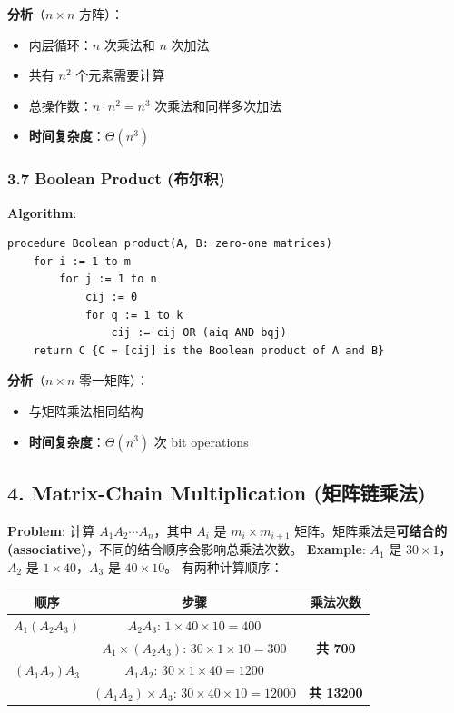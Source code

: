 \documentclass[10pt,a4paper,openany]{ctexbook}
\theoremstyle{definition}
\theoremstyle{remark}
\begin{document}
\textbf{分析}（$n \times n$ 方阵）：
\begin{itemize}
\item 内层循环：$n$ 次乘法和 $n$ 次加法
\item 共有 $n^2$ 个元素需要计算
\item 总操作数：$n \cdot n^2 = n^3$ 次乘法和同样多次加法
\item \textbf{时间复杂度}：$\Theta(n^3)$

\end{itemize}

\subsubsection{3.7 Boolean Product (布尔积)}

\textbf{Algorithm}:
{\footnotesize\begin{verbatim}
procedure Boolean product(A, B: zero-one matrices)
    for i := 1 to m
        for j := 1 to n
            cij := 0
            for q := 1 to k
                cij := cij OR (aiq AND bqj)
    return C {C = [cij] is the Boolean product of A and B}
\end{verbatim}}

\textbf{分析}（$n \times n$ 零一矩阵）：
\begin{itemize}
\item 与矩阵乘法相同结构
\item \textbf{时间复杂度}：$\Theta(n^3)$ 次 bit operations

\end{itemize}

\vspace{-2pt}

\subsection{4. Matrix-Chain Multiplication (矩阵链乘法)}

\textbf{Problem}: 计算 $A_1 A_2 \cdots A_n$，其中 $A_i$ 是 $m_i \times m_{i+1}$ 矩阵。矩阵乘法是\textbf{可结合的 (associative)}，不同的结合顺序会影响总乘法次数。
\textbf{Example}: $A_1$ 是 $30 \times 1$，$A_2$ 是 $1 \times 40$，$A_3$ 是 $40 \times 10$。
有两种计算顺序：
\begin{center}
\begin{tabular}{ccc}
\hline
顺序 & 步骤 & 乘法次数 \\ \hline
$A_1(A_2A_3)$ & $A_2A_3$: $1 \times 40 \times 10 = 400$ &  \\
 & $A_1 \times (A_2A_3)$: $30 \times 1 \times 10 = 300$ & \textbf{共 700} \\
$(A_1A_2)A_3$ & $A_1A_2$: $30 \times 1 \times 40 = 1200$ &  \\
 & $(A_1A_2) \times A_3$: $30 \times 40 \times 10 = 12000$ & \textbf{共 13200} \\
\hline
\end{tabular}

\end{center}
\end{document}
